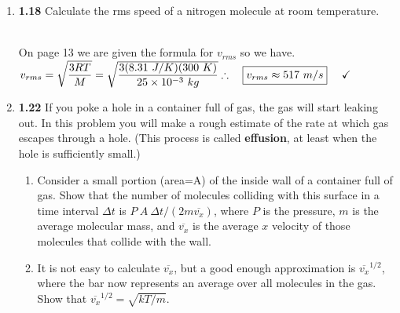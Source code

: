 \documentclass[fleqn]{article}
\begin{document}
\begin{enumerate}
\begin{enumerate}
    \end{enumerate}
    
    \item \textbf{1.18} Calculate the rms speed of a nitrogen molecule at room temperature.

        \textcolor{hwColor}{
          \\
          On page 13 we are given the formula for $v_{rms}$ so we have.
          $
            \\
            \\
            v_{rms}=\sqrt{\dfrac{3RT}{M}}=\sqrt{\dfrac{3 (8.31 ~ J/K) (300 ~ K)}{25 \times 10^{-3} ~ kg}}
            \\
            \\
            \\
            \therefore ~~~ \boxed{
              v_{rms} \approx 517 ~ m/s
            } ~~~~ \checkmark
            \\
          $
        }
    
    \item \textbf{1.22} If you poke a hole in a container full of gas, the gas will start leaking out. In this problem you 
    will make a rough estimate of the rate at which gas escapes through a hole. (This process is called \textbf{effusion}, at least when 
    the hole is sufficiently small.)

      \begin{enumerate}
        \item Consider a small portion (area=A) of the inside wall of a container full of gas. Show that the number of molecules colliding
        with this surface in a time interval $\Delta t$ is $P ~ A ~ \Delta t/(2m \overline{v_x})$, where $P$ is the pressure, $m$ is the 
        average molecular mass, and $\overline{v_x}$ is the average $x$ velocity of those molecules that collide with the wall.


        \item It is not easy to calculate $\overline{v_x}$, but a good enough approximation is $\overline{v_x}^{1/2}$, where the bar 
        now represents an average over all molecules in the gas. Show that $\overline{v_x}^{1/2}=\sqrt{kT/m}.$

          

\end{enumerate}
\end{enumerate}
\end{document}
